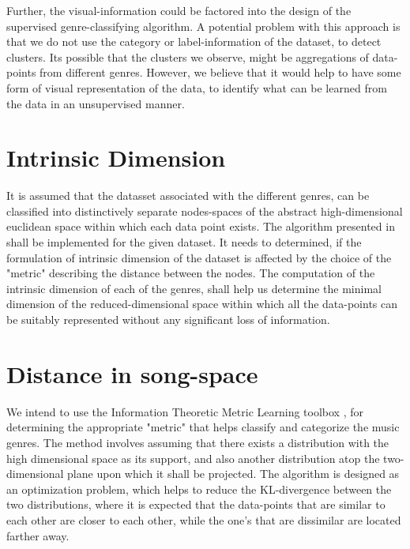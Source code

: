 \documentclass[12pt]{article}
\begin{document}
Further, the visual-information could be factored into the design of the supervised genre-classifying algorithm. A potential problem with this approach is that we do not use the category or label-information of the dataset, to detect clusters. Its possible that the clusters we observe, might be aggregations of data-points from different genres. However, we believe that it would help to have some form of visual representation of the data, to identify what can be learned from the data in an unsupervised manner. 


\section{Intrinsic Dimension}
It is assumed that the datasset associated with the different genres, can be classified into distinctively separate nodes-spaces of the abstract high-dimensional euclidean space within which each data point exists. The algorithm presented in \cite{intrinsicDims} shall be implemented for the given dataset. It needs to determined, if the formulation of intrinsic dimension of the dataset is affected by the choice of the "metric" describing the distance between the nodes. The computation of the intrinsic dimension of each of the genres, shall help us determine the minimal dimension of the reduced-dimensional space within which all the data-points can be suitably represented without any significant loss of information. 


\section{Distance in song-space}

We intend to use the Information Theoretic Metric Learning toolbox \cite{infoTheoryMetricLearning}, for determining the appropriate "metric" that helps classify and categorize the music genres. The method involves assuming that there exists a distribution with the high dimensional space as its support, and also another distribution atop the two-dimensional plane upon which it shall be projected. The algorithm is designed as an optimization problem, which helps to reduce the KL-divergence between the two distributions, where it is expected that the data-points that are similar to each other are closer to each other, while the one's that are dissimilar are located farther away. 
\end{document}
